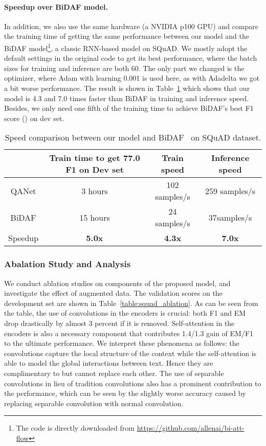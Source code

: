 \documentclass{article} \usepackage{iclr2018_conference,times}
\begin{document}
\paragraph{Speedup over BiDAF model.}
In addition, we also use the same hardware (a NVIDIA p100 GPU) and compare the training time of getting the same performance between our model and the BiDAF model\footnote{The code is directly downloaded from \url{https://github.com/allenai/bi-att-flow}}\citep{SeoKFH16}, a classic RNN-based model on SQuAD. We mostly adopt the default settings in the original code to get its best performance, where the batch sizes for training and inference are both 60. The only part we changed is the optimizer, where Adam with learning 0.001 is used here, as with Adadelta we got a bit worse performance. The result is shown in Table~\ref{table:squad_vs_bidaf} which shows that our model is 4.3 and 7.0 times faster than BiDAF in training and inference speed. Besides, we only need one fifth of the training time to achieve BiDAF's best F1 score () on dev set.

\begin{table}[h!]
\small
\begin{center}
\begin{tabular}{c|c|c|c}
\hline &  Train time to get 77.0 F1 on Dev set& Train speed & Inference speed\\\hline 
QANet & 3 hours& 102  samples/s & 259 samples/s \\
BiDAF& 15 hours &  24 samples/s &  37samples/s\\\hline
Speedup & \textbf{5.0x} & \textbf{4.3x} & \textbf{7.0x}
\\\hline \end{tabular}
\end{center}
\caption{Speed comparison between our model and BiDAF~\citep{SeoKFH16} on SQuAD dataset.}
\label{table:squad_vs_bidaf}
 \end{table}


\subsubsection{Abalation Study and Analysis}
We conduct ablation studies on components of the proposed model, and investigate the  effect of augmented data. The validation scores on the development set are shown in Table~\ref{table:squad_ablation}. As can be seen from the table, the use of convolutions in the encoders is crucial: both F1 and EM drop drastically by almost 3 percent if it is removed. Self-attention in the encoders is also a necessary component that contributes 1.4/1.3 gain of EM/F1 to the ultimate performance. We interpret these phenomena as follows: the convolutions capture the local structure of the context while the self-attention is able to model the global interactions between text.
Hence they are complimentary to but cannot replace each other. The use of separable convolutions in lieu of tradition convolutions also has a prominent contribution to the performance, which can be seen by the slightly worse accuracy caused by replacing separable convolution with normal convolution. 
\end{document}
